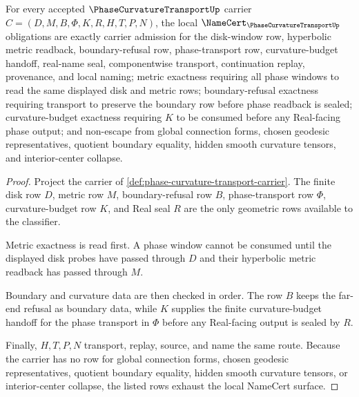\begin{theorem}
\label{thm:phase-curvature-transport-namecert-obligations}
For every accepted $\PhaseCurvatureTransportUp$ carrier $C=(D,M,B,\Phi,K,R,H,T,P,N)$, the local $\NameCert_{\PhaseCurvatureTransportUp}$ obligations are exactly carrier admission for the disk-window row, hyperbolic metric readback, boundary-refusal row, phase-transport row, curvature-budget handoff, real-name seal, componentwise transport, continuation replay, provenance, and local naming; metric exactness requiring all phase windows to read the same displayed disk and metric rows; boundary-refusal exactness requiring transport to preserve the boundary row before phase readback is sealed; curvature-budget exactness requiring $K$ to be consumed before any Real-facing phase output; and non-escape from global connection forms, chosen geodesic representatives, quotient boundary equality, hidden smooth curvature tensors, and interior-center collapse.
\end{theorem}
\begin{proof}
Project the carrier of \autoref{def:phase-curvature-transport-carrier}. The finite disk row $D$, metric row $M$, boundary-refusal row $B$, phase-transport row $\Phi$, curvature-budget row $K$, and Real seal $R$ are the only geometric rows available to the classifier.

Metric exactness is read first. A phase window cannot be consumed until the displayed disk probes have passed through $D$ and their hyperbolic metric readback has passed through $M$.

Boundary and curvature data are then checked in order. The row $B$ keeps the far-end refusal as boundary data, while $K$ supplies the finite curvature-budget handoff for the phase transport in $\Phi$ before any Real-facing output is sealed by $R$.

Finally, $H,T,P,N$ transport, replay, source, and name the same route. Because the carrier has no row for global connection forms, chosen geodesic representatives, quotient boundary equality, hidden smooth curvature tensors, or interior-center collapse, the listed rows exhaust the local NameCert surface.
\end{proof}



